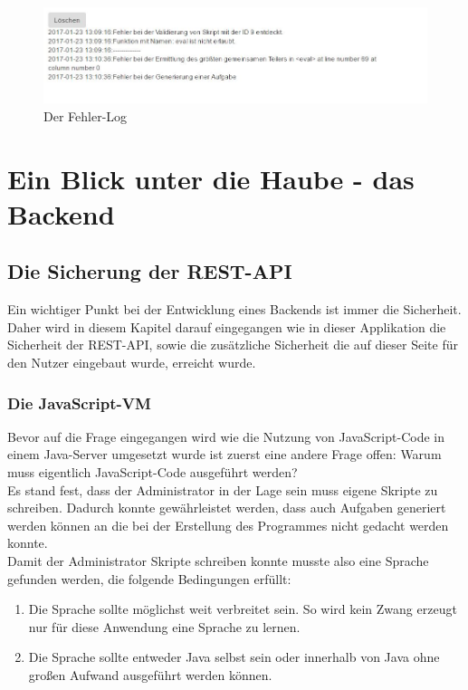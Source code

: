 \begin{figure}[htp]     %
\centering
\includegraphics[width=1\textwidth]{bilder/ErrorLog} 
\caption[Der Fehler-Log]{Der Fehler-Log}
\end{figure} 




\chapter{Ein Blick unter die Haube - das Backend}

\section{Die Sicherung der REST-API}

Ein wichtiger Punkt bei der Entwicklung eines Backends ist immer die Sicherheit. Daher wird in diesem Kapitel darauf eingegangen wie in dieser Applikation die Sicherheit der REST-API, sowie die zusätzliche Sicherheit die auf dieser Seite für den Nutzer eingebaut wurde, erreicht wurde. \\


\subsection{Die JavaScript-VM}

Bevor auf die Frage eingegangen wird wie die Nutzung von JavaScript-Code in einem Java-Server umgesetzt wurde ist zuerst eine andere Frage offen: Warum muss eigentlich JavaScript-Code ausgeführt werden? \\

Es stand fest, dass der Administrator in der Lage sein muss eigene Skripte zu schreiben. Dadurch konnte gewährleistet werden, dass auch Aufgaben generiert werden können an die bei der Erstellung des Programmes nicht gedacht werden konnte. \\
Damit der Administrator Skripte schreiben konnte musste also eine Sprache gefunden werden, die folgende Bedingungen erfüllt:
\begin{enumerate}
\item Die Sprache sollte möglichst weit verbreitet sein. So wird kein Zwang erzeugt nur für diese Anwendung eine Sprache zu lernen.
\item Die Sprache sollte entweder Java selbst sein oder innerhalb von Java ohne großen Aufwand ausgeführt werden können.
\end{enumerate}

